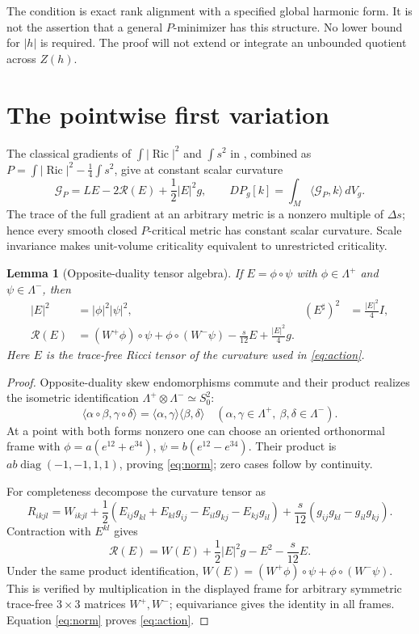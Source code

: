 \documentclass[11pt,a4paper]{article}
\newtheorem{lemma}[theorem]{Lemma}
\theoremstyle{remark}\newtheorem{remark}[theorem]{Remark}
\newcommand{\Ric}{\operatorname{Ric}}
\newcommand{\GP}{\mathcal G_P}
\newcommand{\ip}[2]{\langle #1,#2\rangle}
\numberwithin{equation}{section}
\begin{document}
The condition is exact rank alignment with a specified global harmonic
form. It is not the assertion that a general $P$-minimizer has this structure.
No lower bound for $|h|$ is required. The proof will not extend or integrate
an unbounded quotient across $Z(h)$.

\section{The pointwise first variation}
The classical gradients of $\int|\Ric|^2$ and $\int s^2$ in
\cite[(2.5), (2.9)]{GV}, combined as $P=\int|\Ric|^2-\frac14\int s^2$,
give at constant scalar curvature
\begin{equation}\label{eq:grad}
 \GP=LE-2\mathscr R(E)+\frac12|E|^2g,
 \qquad DP_g[k]=\int_M\ip{\GP}{k}\,dV_g.
\end{equation}
The trace of the full gradient at an arbitrary metric is a nonzero multiple
of $\Delta s$; hence every smooth closed $P$-critical metric has constant
scalar curvature. Scale invariance makes unit-volume criticality equivalent
to unrestricted criticality.

\begin{lemma}[Opposite-duality tensor algebra]\label{lem:algebra}
If $E=\phi\circ\psi$ with $\phi\in\Lambda^+$ and $\psi\in\Lambda^-$,
then
\begin{align}
 |E|^2&=|\phi|^2|\psi|^2,&
 (E^\sharp)^2&=\frac{|E|^2}{4}I,\label{eq:norm}\\
 \mathscr R(E)&=(W^+\phi)\circ\psi+\phi\circ(W^-\psi)
               -\frac{s}{12}E+\frac{|E|^2}{4}g.
 \label{eq:action}
\end{align}
Here $E$ is the trace-free Ricci tensor of the curvature used in
\eqref{eq:action}.
\end{lemma}
\begin{proof}
Opposite-duality skew endomorphisms commute and their product realizes the
isometric identification $\Lambda^+\otimes\Lambda^-\simeq S_0^2$:
\begin{equation}\label{eq:inner}
 \ip{\alpha\circ\beta}{\gamma\circ\delta}
 =\ip{\alpha}{\gamma}\ip{\beta}{\delta}
 \quad(\alpha,\gamma\in\Lambda^+,\ \beta,\delta\in\Lambda^-).
\end{equation}
At a point with both forms nonzero one can choose an oriented orthonormal
frame with $\phi=a(e^{12}+e^{34})$, $\psi=b(e^{12}-e^{34})$.
Their product is $ab\operatorname{diag}(-1,-1,1,1)$, proving
\eqref{eq:norm}; zero cases follow by continuity.

For completeness decompose the curvature tensor as
\[
 R_{ikjl}=W_{ikjl}+\frac12
 (E_{ij}g_{kl}+E_{kl}g_{ij}-E_{il}g_{kj}-E_{kj}g_{il})
 +\frac{s}{12}(g_{ij}g_{kl}-g_{il}g_{kj}).
\]
Contraction with $E^{kl}$ gives
\[
 \mathscr R(E)=W(E)+\frac12|E|^2g-E^2-\frac{s}{12}E.
\]
Under the same product identification,
$W(E)=(W^+\phi)\circ\psi+\phi\circ(W^-\psi)$.
This is verified by multiplication in the displayed frame for arbitrary
symmetric trace-free $3\times3$ matrices $W^+,W^-$; equivariance gives the
identity in all frames. Equation \eqref{eq:norm} proves \eqref{eq:action}.
\end{proof}
\end{document}
